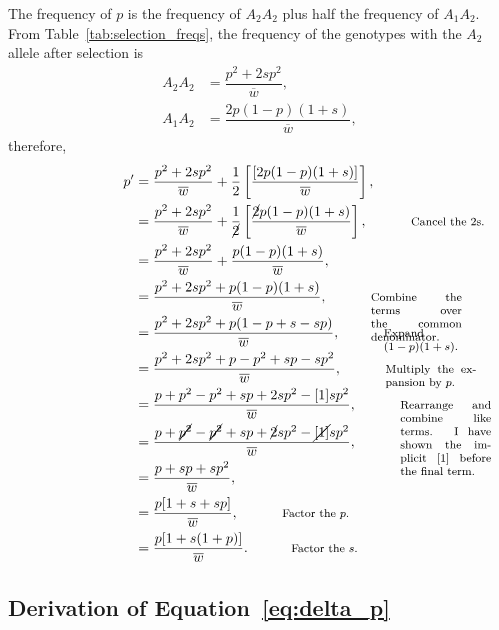 \documentclass[letterpaper,nofonts]{tufte-handout}
\def\mathnote#1{%
  \tag*{\rlap{\hspace\marginparsep\smash{\parbox[t]{\marginparwidth}{%
  \footnotesize#1}}}}
}
\begin{document}
The frequency of $p$ is the frequency of $A_2A_2$ plus half the frequency of $A_1A_2$. From Table~\ref{tab:selection_freqs}, the frequency of the genotypes with the $A_2$ allele after selection is
{
\setlength{\jot}{0.8em}
\begin{align*}
A_2A_2 &= \dfrac{p^2 + 2sp^2}{\overline{w}},\\
A_1A_2 &= \dfrac{2p(1-p)(1+s)}{\overline{w}},
\end{align*}
}
therefore,
{\setlength{\jot}{0.8em}
\begin{align*}
p^\prime &= \dfrac{p^2 + 2sp^2}{\overline{w}} + \dfrac{1}{2}\left[\dfrac{[2p(1-p)(1+s)]}{\overline{w}}\right],\\
%
         &= \dfrac{p^2 + 2sp^2}{\overline{w}} + \dfrac{1}{\cancel{2}}\left[\dfrac{\cancel{2}p(1-p)(1+s)}{\overline{w}}\right], \mathnote{Cancel the 2s.}\\
%
         &= \dfrac{p^2 + 2sp^2}{\overline{w}} + \dfrac{p(1-p)(1+s)}{\overline{w}},\\
%
         &= \dfrac{p^2 + 2sp^2 + p(1-p)(1+s)}{\overline{w}},\mathnote{Combine the terms over the common denominator.}\\
%
%
         &= \dfrac{p^2 + 2sp^2 + p(1-p +s-sp)}{\overline{w}},\mathnote{Expand $(1-p)(1+s)$.}\\
%
         &= \dfrac{p^2 + 2sp^2 + p - p^2 +sp - sp^2}{\overline{w}}, \mathnote{Multiply the expansion by $p$.}\\
%
         &= \dfrac{p + p^2 - p^2 + sp + 2sp^2 - [1]sp^2}{\overline{w}},\mathnote{Rearrange and combine like terms. I have shown the implicit [1] before the final term.}\\
%
         &= \dfrac{p + \cancel{p^2} - \cancel{p^2} + sp + \cancel{2}sp^2 - \cancel{[1]}sp^2}{\overline{w}},\\
%
         &= \dfrac{p + sp + sp^2}{\overline{w}},\\
%
         &= \dfrac{p[1 + s + sp]}{\overline{w}},\mathnote{Factor the $p.$}\\
%
         &= \dfrac{p[1 + s(1 + p)]}{\overline{w}}.\mathnote{Factor the $s.$}
\end{align*}
}

\newpage

\subsection{Derivation of Equation~\ref{eq:delta_p}}
%
\label{deriv:delta_p}
\end{document}
